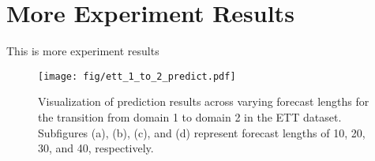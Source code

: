\section{More Experiment Results}

This is more experiment results
% 
% 

\begin{figure*}[h]
    \centering
    \texttt{[image: fig/ett\_1\_to\_2\_predict.pdf]}
    \caption{Visualization of prediction results across varying forecast lengths for the transition from domain 1 to domain 2 in the ETT dataset. Subfigures (a), (b), (c), and (d) represent forecast lengths of 10, 20, 30, and 40, respectively.}
    \label{fig:diff_len_mase}
\end{figure*}


